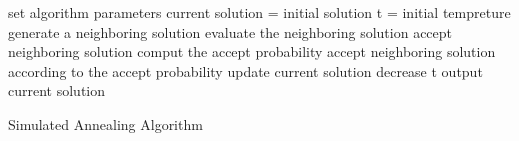 \begin{algorithm2e}[h]
	set algorithm parameters\;
	current solution = initial solution\;
	t = initial tempreture\;
	{
		{
			generate a neighboring solution\;
			evaluate the neighboring solution\;
			{
				accept neighboring solution\;
			}
			{
				comput the accept probability\;
				accept neighboring solution according to the accept probability\;
			}
			update current solution\;
		}
		decrease t\;
	}
	output current solution\;
	\caption{Simulated Annealing Algorithm}
	\label{algo:simulated_annealing}
\end{algorithm2e}